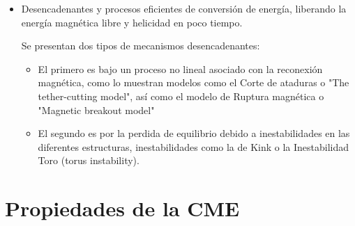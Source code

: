 \begin{itemize}
\begin{itemize}
    \item Movimiento de cizallamiento y rotación, indicando movimientos en la superficie del Sol que deforman y retuercen las líneas del campo magnético coronal, permitiendo almacenar energía magnética libre y helicidad. Ocurre cuando se tienen dos regiones con líneas de campo magnético perpendiculares a la superficie del Sol que se desplazan en direcciones opuestas, provocando que las líneas de campo se estiren y deformen aumentando la energía magnética almacenada y por ende la tensión magnética. Esta última se define como:
    \begin{equation}
        T=\frac{1}{\mu_{0}}(B\cdot \Delta)B
    \end{equation}
La tensión magnética busca reducir la torsión o curvatura de una línea de campo magnético, esto hace que ayude a generar estabilidad en las diferentes estructuras solares. Cuando hay demasiada tensión magnética en una línea de campo magnético, esta será inestable y se producirá una erupción como medida para liberar energía acumulada. Además, puede presentar torsión si una de las regiones presenta una rotación sobre su propio eje, lo que generaría una estructura helicoidal.
    \end{itemize}
\item Desencadenantes y procesos eficientes de conversión de energía, liberando la energía magnética libre y helicidad en poco tiempo.

Se presentan dos tipos de mecanismos desencadenantes:
\begin{itemize}
    \item El primero es bajo un proceso no lineal asociado con la reconexión magnética, como lo muestran modelos como el Corte de ataduras o "The tether-cutting model", así como el modelo de Ruptura magnética o "Magnetic breakout model"
\item El segundo es por la perdida de equilibrio debido a inestabilidades en las diferentes estructuras, inestabilidades como la de Kink o la Inestabilidad Toro (torus instability).
\end{itemize}
\end{itemize}

\section{Propiedades de la CME}

